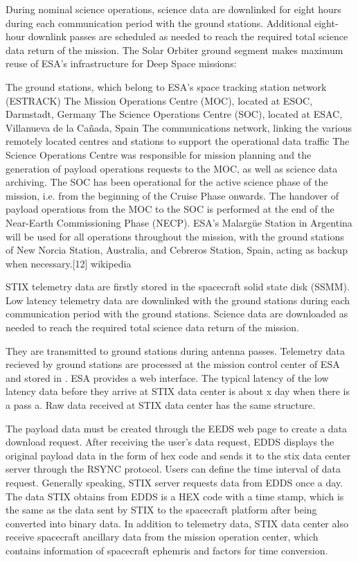 \documentclass{aa}
\begin{document}
During nominal science operations, science data are downlinked for eight hours during each
communication period with the ground stations. Additional eight-hour downlink passes are
scheduled as needed to reach the required total science data return of the mission.
The Solar Orbiter ground segment makes maximum reuse of ESA's infrastructure for Deep Space missions:

The ground stations, which belong to ESA's space tracking station network (ESTRACK)
The Mission Operations Centre (MOC), located at ESOC, Darmstadt, Germany
The Science Operations Centre (SOC), located at ESAC, Villanueva de la Cañada, Spain
The communications network, linking the various remotely located centres and stations to support the operational data traffic
The Science Operations Centre was responsible for mission planning and the generation of payload operations requests to the MOC, as well as science data archiving. The SOC has been operational for the active science phase of the mission, i.e. from the beginning of the Cruise Phase onwards. The handover of payload operations from the MOC to the SOC is performed at the end of the Near-Earth Commissioning Phase (NECP). ESA's Malargüe Station in Argentina will be used for all operations throughout the mission, with the ground stations of New Norcia Station, Australia, and Cebreros Station, Spain, acting as backup when necessary.[12] wikipedia

STIX telemetry data are firstly stored in the spacecraft solid state disk (SSMM).
Low latency telemetry data are downlinked  with the ground stations during each communication period with the ground stations.
Science data are downloaded  as needed to reach the required total science data return of the mission.

They are transmitted to ground stations during antenna passes.
Telemetry data recieved by ground stations are processed at the mission control center of ESA and
stored in .
ESA provides a web interface.
The typical latency of the low latency data before they arrive at STIX data center is about x day when there is a pass a.
Raw data received at STIX data center has the same structure.

The payload data must be created through the EEDS web page to create a data download request.
After receiving the user's data request, EDDS displays the original payload data in the form of hex code and sends it to the stix data center server through the RSYNC protocol. Users can define the time interval of data request. Generally speaking, STIX server requests data from EDDS once a day. The data STIX obtains from EDDS is a HEX code with a time stamp, which is the same as the data sent by STIX to the spacecraft platform after being converted into binary data.
In addition to telemetry data, STIX data center also receive spacecraft ancillary data from
the mission operation center, which contains
information of spacecraft ephemris and factors for time conversion.
\end{document}
